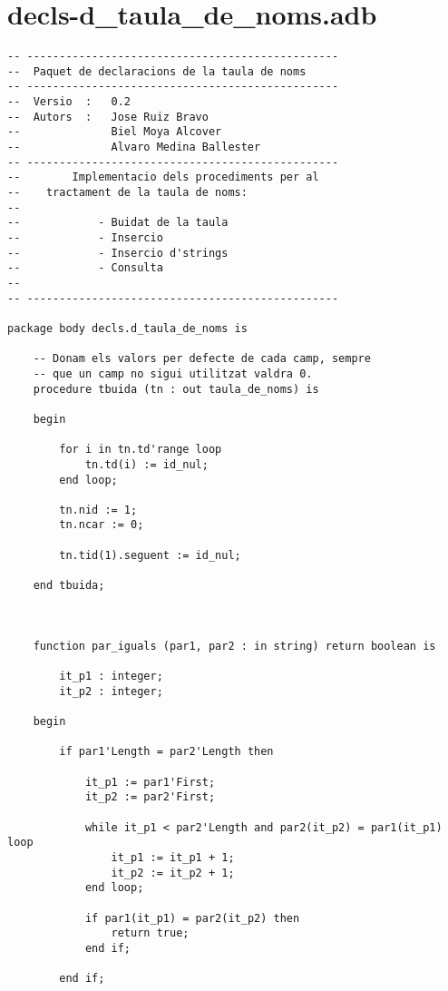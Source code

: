\documentclass[10pt]{report}
\begin{document}
    \newpage
    \section{decls-d\_taula\_de\_noms.adb}
    \begin{lstlisting}[style=Ada]
-- ------------------------------------------------
--  Paquet de declaracions de la taula de noms
-- ------------------------------------------------
--  Versio  :   0.2
--  Autors  :   Jose Ruiz Bravo
--              Biel Moya Alcover
--              Alvaro Medina Ballester
-- ------------------------------------------------
--        Implementacio dels procediments per al
--    tractament de la taula de noms:
--
--            - Buidat de la taula
--            - Insercio
--            - Insercio d'strings
--            - Consulta
--
-- ------------------------------------------------

package body decls.d_taula_de_noms is

    -- Donam els valors per defecte de cada camp, sempre 
    -- que un camp no sigui utilitzat valdra 0.
    procedure tbuida (tn : out taula_de_noms) is
    
    begin 
    
        for i in tn.td'range loop
            tn.td(i) := id_nul;
        end loop;
        
        tn.nid := 1;
        tn.ncar := 0;
        
        tn.tid(1).seguent := id_nul;
        
    end tbuida;
    
    
    
    function par_iguals (par1, par2 : in string) return boolean is
    
        it_p1 : integer;
        it_p2 : integer;
        
    begin
            
        if par1'Length = par2'Length then
            
            it_p1 := par1'First;
            it_p2 := par2'First;
                        
            while it_p1 < par2'Length and par2(it_p2) = par1(it_p1) loop
                it_p1 := it_p1 + 1;
                it_p2 := it_p2 + 1;
            end loop;
    
            if par1(it_p1) = par2(it_p2) then
                return true;
            end if;
            
        end if;
        

\end{lstlisting}
\end{document}
